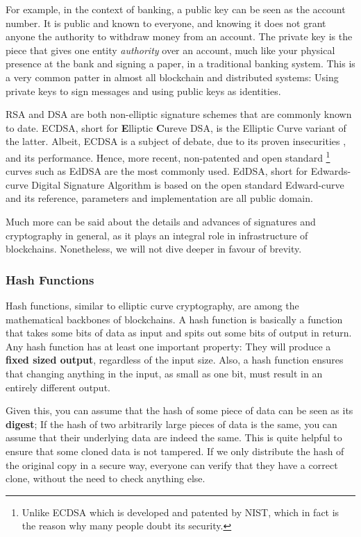 For example, in the context of banking, a public key can be seen as the account number. It is public
and known to everyone, and knowing it does not grant anyone the authority to withdraw money from an
account. The private key is the piece that gives one entity \textit{authority} over an account, much
like your physical presence at the bank and signing a paper, in a traditional banking system. This
is a very common patter in almost all blockchain and distributed systems: Using private keys to sign
messages and using public keys as identities.

RSA and DSA are both non-elliptic signature schemes that are commonly known to date. ECDSA, short
for \textbf{E}lliptic \textbf{C}ureve DSA, is the Elliptic Curve variant of the latter. Albeit,
ECDSA is a subject of debate, due to its proven insecurities
\cite{Brumley_Tuveri_2011_remote_timing_ecdsa}, and its performance. Hence, more recent,
non-patented and open standard \footnote{Unlike ECDSA which is developed and patented by NIST, which
in fact is the reason why many people doubt its security.} curves such as EdDSA are the most
commonly used. EdDSA, short for Edwards-curve Digital Signature Algorithm is based on the open
standard Edward-curve and its reference, parameters and implementation are all public domain.

Much more can be said about the details and advances of signatures and cryptography in general, as
it plays an integral role in infrastructure of blockchains. Nonetheless, we will not dive deeper in
favour of brevity.

\subsubsection{Hash Functions} \label{chap_bg:subsec:hash}

Hash functions, similar to elliptic curve cryptography, are among the mathematical backbones of
blockchains. A hash function is basically a function that takes some bits of data as input and spits
out some bits of output in return. Any hash function has at least one important property: They will
produce a \textbf{fixed sized output}, regardless of the input size. Also, a hash function ensures
that changing anything in the input, as small as one bit, must result in an entirely different
output.

Given this, you can assume that the hash of some piece of data can be seen as its \textbf{digest};
If the hash of two arbitrarily large pieces of data is the same, you can assume that their
underlying data are indeed the same. This is quite helpful to ensure that some cloned data is not
tampered. If we only distribute the hash of the original copy in a secure way, everyone can verify
that they have a correct clone, without the need to check anything else.

